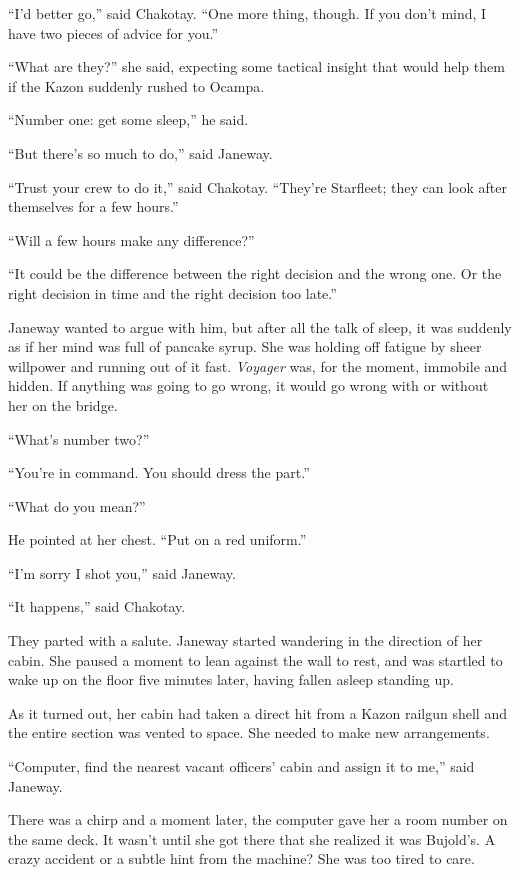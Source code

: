 \documentclass[twoside,letterpaper,12pt]{memoir}
\begin{document}
``I'd better go,'' said Chakotay. ``One more thing, though. If you don't mind, I have two pieces of advice for you.''

``What are they?'' she said, expecting some tactical insight that would help them if the Kazon suddenly rushed to Ocampa.

``Number one: get some sleep,'' he said.

``But there's so much to do,'' said Janeway.

``Trust your crew to do it,'' said Chakotay. ``They're Starfleet; they can look after themselves for a few hours.''

``Will a few hours make any difference?''

``It could be the difference between the right decision and the wrong one. Or the right decision in time and the right decision too late.''

Janeway wanted to argue with him, but after all the talk of sleep, it was suddenly as if her mind was full of pancake syrup. She was holding off fatigue by sheer willpower and running out of it fast. \textit{Voyager} was, for the moment, immobile and hidden. If anything was going to go wrong, it would go wrong with or without her on the bridge.

``What's number two?''

``You're in command. You should dress the part.''

``What do you mean?''

He pointed at her chest. ``Put on a red uniform.''

``I'm sorry I shot you,'' said Janeway.

``It happens,'' said Chakotay.

They parted with a salute. Janeway started wandering in the direction of her cabin. She paused a moment to lean against the wall to rest, and was startled to wake up on the floor five minutes later, having fallen asleep standing up.

As it turned out, her cabin had taken a direct hit from a Kazon railgun shell and the entire section was vented to space. She needed to make new arrangements.

``Computer, find the nearest vacant officers' cabin and assign it to me,'' said Janeway.

There was a chirp and a moment later, the computer gave her a room number on the same deck. It wasn't until she got there that she realized it was Bujold's. A crazy accident or a subtle hint from the machine? She was too tired to care.
\end{document}
